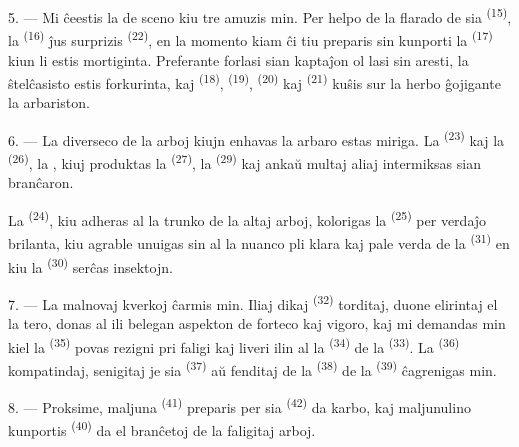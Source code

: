 \VUsaut{3.0mm}
\VUsaut{3.0mm}

5. --- Mi ĉeestis la  de sceno kiu tre amuzis min. Per helpo de la
flarado de sia  \textsuperscript{(15)}, la
 \textsuperscript{(16)} ĵus surprizis 
\textsuperscript{(22)}, en la momento kiam ĉi tiu preparis sin kunporti la
 \textsuperscript{(17)} kiun li estis mortiginta. Preferante
forlasi sian kaptaĵon ol lasi sin aresti, la ŝtelĉasisto estis forkurinta, kaj
 \textsuperscript{(18)},  \textsuperscript{(19)},
 \textsuperscript{(20)} kaj 
\textsuperscript{(21)} kuŝis sur la herbo ĝojigante la arbariston.

6. --- La diverseco de la arboj kiujn enhavas la arbaro estas miriga. La
 \textsuperscript{(23)} kaj la 
\textsuperscript{(26)}, la , kiuj produktas la 
\textsuperscript{(27)}, la  \textsuperscript{(29)} kaj ankaŭ
multaj aliaj intermiksas sian branĉaron.

La  \textsuperscript{(24)}, kiu adheras al la trunko de la altaj
arboj, kolorigas la  \textsuperscript{(25)} per verdaĵo
brilanta, kiu agrable unuigas sin al la nuanco pli klara kaj pale verda de la
 \textsuperscript{(31)} en kiu la 
\textsuperscript{(30)} serĉas insektojn.

\VUsaut{3.0mm}
\VUsaut{3.0mm}

7. --- La malnovaj kverkoj ĉarmis min. Iliaj dikaj 
\textsuperscript{(32)} torditaj, duone elirintaj el la tero, donas al ili
belegan aspekton de forteco kaj vigoro, kaj mi demandas min kiel la
 \textsuperscript{(35)} povas rezigni pri faligi kaj liveri
ilin al la  \textsuperscript{(34)} de la 
\textsuperscript{(33)}. La  \textsuperscript{(36)}
kompatindaj, senigitaj je sia  \textsuperscript{(37)} aŭ fenditaj
de la  \textsuperscript{(38)} de la 
\textsuperscript{(39)} ĉagrenigas min.

8. --- Proksime, maljuna  \textsuperscript{(41)} preparis
per sia  \textsuperscript{(42)} da karbo, kaj maljunulino
kunportis  \textsuperscript{(40)} da  el
branĉetoj de la faligitaj arboj.


